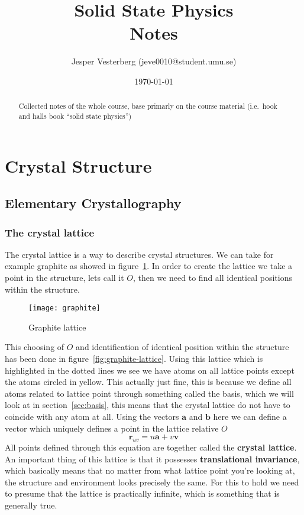 \documentclass[11pt]{article}
\title{Solid State Physics \\ Notes}
\author{Jesper Vesterberg (jeve0010@student.umu.se)}
\date{\today}
\begin{document}
\begin{titlepage}
  \maketitle
  \thispagestyle{fancy}
  \rhead{\today}
  \begin{abstract}
		Collected notes of the whole course, base primarly on the course material (i.e.\ hook and halls book ``solid state physics'')
  \end{abstract}
\end{titlepage}
\lhead{\theauthor}
\rhead{\thetitle\\\today}
\cfoot{\thepage}


\section{Crystal Structure}
\subsection{Elementary Crystallography}
\subsubsection{The crystal lattice}
The crystal lattice is a way to describe crystal structures. We can take for example graphite as showed in figure~\ref{fig:graphite}. In order to create the lattice we take a point in the structure, lets call it $O$, then we need to find all identical positions within the structure.

\begin{figure}[H]
	\centering
	\texttt{[image: graphite]}
	\caption{Graphite lattice}
	\label{fig:graphite}
\end{figure}

\newpage
This choosing of $O$ and identification of identical position within the structure has been done in figure~\ref{fig:graphite-lattice}. Using this lattice which is highlighted in the dotted lines we see we have atoms on all lattice points except the atoms circled in yellow. This actually just fine, this is because we define all atoms related to lattice point through something called the basis, which we will look at in section~\ref{sec:basis}, this means that the crystal lattice do not have to coincide with any atom at all. Using the vectors $\mathbf{a}$ and $\mathbf{b}$ here we can define a vector which uniquely defines a point in the lattice relative $O$
\begin{equation}
	\mathbf{r}_{uv }= u\mathbf{a} + v\mathbf{v}
	\label{eq:crystal-lattice}
\end{equation}
All points defined through this equation are together called the \textbf{crystal lattice}. An important thing of this lattice is that it possesses \textbf{translational invariance}, which basically means that no matter from what lattice point you're looking at, the structure and environment looks precisely the same. For this to hold we need to presume that the lattice is practically infinite, which is something that is generally true. 
\end{document}

